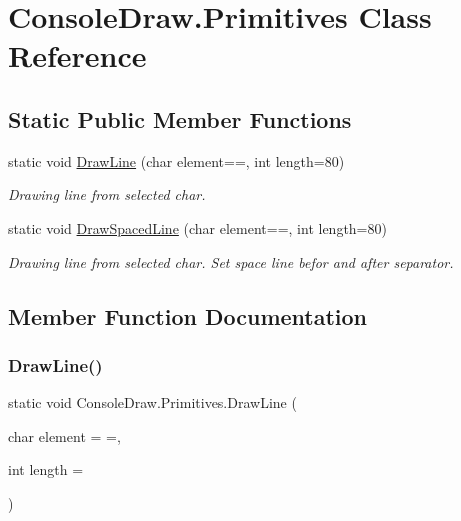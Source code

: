 \hypertarget{class_console_draw_1_1_primitives}{}\section{Console\+Draw.\+Primitives Class Reference}
\label{class_console_draw_1_1_primitives}
\subsection*{Static Public Member Functions}
\begin{DoxyCompactItemize}
\item 
static void \mbox{\hyperlink{class_console_draw_1_1_primitives_ad4b6aaed88ef18e2926febca63abf667}{Draw\+Line}} (char element=\textquotesingle{}=\textquotesingle{}, int length=80)
\begin{DoxyCompactList}\small\item\em Drawing line from selected char. \end{DoxyCompactList}\item 
static void \mbox{\hyperlink{class_console_draw_1_1_primitives_a56f4fc0b28e3e0182208dccaf6944fdb}{Draw\+Spaced\+Line}} (char element=\textquotesingle{}=\textquotesingle{}, int length=80)
\begin{DoxyCompactList}\small\item\em Drawing line from selected char. Set space line befor and after separator. \end{DoxyCompactList}\end{DoxyCompactItemize}


\subsection{Member Function Documentation}
\mbox{\label{class_console_draw_1_1_primitives_ad4b6aaed88ef18e2926febca63abf667}} 
\subsubsection{\texorpdfstring{Draw\+Line()}{DrawLine()}}
{\footnotesize\ttfamily static void Console\+Draw.\+Primitives.\+Draw\+Line (\begin{DoxyParamCaption}\item[{char}]{element = {\ttfamily \textquotesingle{}=\textquotesingle{}},  }\item[{int}]{length = {} }\end{DoxyParamCaption})\hspace{0.3cm}{\ttfamily [static]}}



